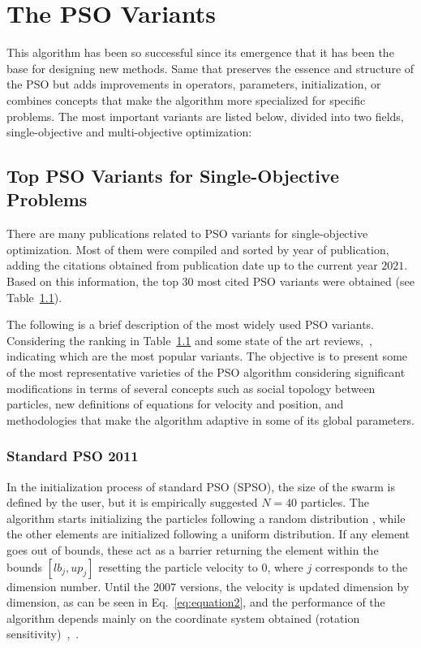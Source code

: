 \section{The PSO Variants}
\label{sec:variants}

This algorithm has been so successful since its emergence that it has been the base for designing new methods. Same that preserves the essence and structure of the PSO but adds improvements in operators, parameters, initialization, or combines concepts that make the algorithm more specialized for specific problems. The most important variants are listed below, divided into two fields, single-objective and multi-objective optimization:\\ 

\subsection{Top PSO Variants for Single-Objective Problems}
\label{tab:pso_variants}
There are many publications related to PSO variants for single-objective optimization. Most of them were compiled and sorted by year of publication, adding the citations obtained from publication date up to the current year $2021$. Based on this information, the top 30 most cited PSO variants were obtained (see Table~\ref{tab:pso_variants}).




The following is a brief description of the most widely used PSO variants. Considering the ranking in Table~\ref{tab:pso_variants} and some state of the art reviews,~\cite{garcia2012brief},~\cite{sousa2017review}~\cite{sedighizadeh2009particle}~\cite{kameyama2009particle} indicating which are the most popular variants. The objective is to present some of the most representative varieties of the PSO algorithm considering significant modifications in terms of several concepts such as social topology between particles, new definitions of equations for velocity and position, and methodologies that make the algorithm adaptive in some of its global parameters.  

\subsubsection{Standard PSO 2011}

In the initialization process of standard PSO (SPSO), the size of the swarm is defined by the user, but it is empirically suggested $N=40$ particles. The algorithm starts initializing the particles following a random distribution \cite{clerc2010particle}, while the other elements are initialized following a uniform distribution. If any element goes out of bounds, these act as a barrier returning the element within the bounds $[lb_j, up_j]$ resetting the particle velocity to $0$, where $j$ corresponds to the dimension number.
Until the 2007 versions, the velocity is updated dimension by dimension, as can be seen in Eq.~\ref{eq:equation2}, and the performance of the algorithm depends mainly on the coordinate system obtained (rotation sensitivity)~\cite{clerc2012beyond},~\cite{spears2012biases}.


